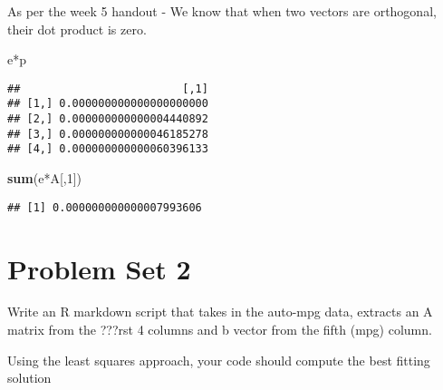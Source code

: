 \documentclass[]{article}
\newenvironment{Shaded}{\begin{snugshade}}{\end{snugshade}}
\newcommand{\KeywordTok}[1]{\textcolor[rgb]{0.13,0.29,0.53}{\textbf{{#1}}}}
\newcommand{\DecValTok}[1]{\textcolor[rgb]{0.00,0.00,0.81}{{#1}}}
\newcommand{\StringTok}[1]{\textcolor[rgb]{0.31,0.60,0.02}{{#1}}}
\newcommand{\NormalTok}[1]{{#1}}
\begin{document}
As per the week 5 handout - We know that when two vectors are
orthogonal, their dot product is zero.

\begin{Shaded}
\begin{Highlighting}[]
\NormalTok{e*p}
\end{Highlighting}
\end{Shaded}

\begin{verbatim}
##                         [,1]
## [1,] 0.000000000000000000000
## [2,] 0.000000000000004440892
## [3,] 0.000000000000046185278
## [4,] 0.000000000000060396133
\end{verbatim}

\begin{Shaded}
\begin{Highlighting}[]
\KeywordTok{sum}\NormalTok{(e*A[,}\DecValTok{1}\NormalTok{])}
\end{Highlighting}
\end{Shaded}

\begin{verbatim}
## [1] 0.000000000000007993606
\end{verbatim}

\section{Problem Set 2}\label{problem-set-2}

Write an R markdown script that takes in the auto-mpg data, extracts an
A matrix from the ???rst 4 columns and b vector from the fifth (mpg)
column.

\begin{Shaded}
\end{Shaded}

Using the least squares approach, your code should compute the best
fitting solution

\begin{Shaded}
\end{Shaded}
\end{document}
